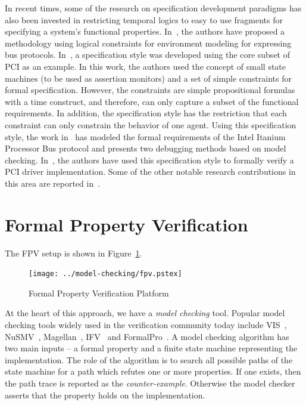 \noindent
In recent times, some of the research on specification development 
paradigms has also been invested in 
restricting temporal logics to easy to use fragments for specifying a
system's functional properties. In~\cite{kmp98}, the authors have
proposed a methodology using logical constraints for environment
modeling for expressing bus protocols. In~\cite{dill:00,dill:01}, a
specification style was developed using the core subset of PCI as an
example. In this work, the authors used the concept of small
state machines (to be used as assertion monitors) and a set of
simple constraints for formal specification. However, the
constraints are simple propositional formulas with a time construct,
and therefore, can only capture a subset of the functional requirements.
In addition, the specification style has the restriction
that each constraint can only constrain the behavior of one agent.
Using this specification style, the work in~\cite{dill:01} has modeled
the formal requirements of the Intel Itanium Processor Bus
protocol and presents two debugging methods based on model
checking. In~\cite{gd00}, the authors have used this specification style to
formally verify a PCI driver implementation. Some of the other notable
research contributions in this area are reported in~\cite{cclw99, mhg98}.

\section{Formal Property Verification} \label{sec2.2}
\noindent
The FPV setup is shown in Figure~\ref{fig2.3}.
\begin{figure}[htb]
\centering
{}
\texttt{[image: ../model-checking/fpv.pstex]}
\center
\caption{Formal Property Verification Platform} \label{fig2.3}
\end{figure}
\noindent
At the heart of this approach, we have a
{\em model checking} tool. Popular model checking tools widely used in
the verification community today include VIS~\cite{vis}, NuSMV~\cite{nusmv},
Magellan~\cite{magellan}, IFV~\cite{ifv} and FormalPro~\cite{formalpro}.
A model checking algorithm has two main
inputs -- a formal property and a finite state machine representing the
implementation. The role of the algorithm is to search all possible paths
of the state machine for a path which refutes one or more properties. If one
exists, then the path trace is reported as the {\em counter-example}. Otherwise
the model checker asserts that the property holds on the implementation. 

